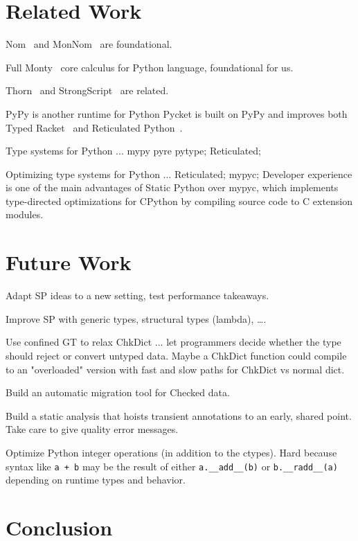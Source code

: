 \documentclass[english,cleveref,submission]{programming}
\newcommand{\SP}{Static Python}
\newcommand{\code}[1]{\texttt{#1}}
\begin{document}
\section{Related Work}
\label{s:related}

Nom~\cite{mt-oopsla-2017} and MonNom~\cite{mt-oopsla-2021} are foundational.

Full Monty~\cite{pmmwplck-oopsla-2013} core calculus for Python language, foundational for us.

Thorn~\cite{wnlov-popl-2010} and StrongScript~\cite{rzv-ecoop-2015} are related.

PyPy is another runtime for Python
Pycket is built on PyPy and improves both Typed Racket~\cite{bbst-oopsla-2017}
and Reticulated Python~\cite{vsc-dls-2019}.

Type systems for Python ...
mypy pyre pytype;
Reticulated;

Optimizing type systems for Python ...
Reticulated;
mypyc;
Developer experience is one of the main advantages of \SP{} over mypyc,
which implements type-directed optimizations for CPython
by compiling source code to C extension modules.



\section{Future Work}
\label{s:future}

Adapt SP ideas to a new setting, test performance takeaways.

Improve SP with generic types, structural types (lambda), \ldots.

Use confined GT to relax ChkDict ... let programmers decide whether
the type should reject or convert untyped data.
Maybe a ChkDict function could compile to an "overloaded" version with
fast and slow paths for ChkDict vs normal dict.

Build an automatic migration tool for Checked data.

Build a static analysis that hoists transient annotations to an early, shared point.
Take care to give quality error messages.

Optimize Python integer operations (in addition to the ctypes).
Hard because syntax like \code{a + b} may be the result of either \code{a.\_\_add\_\_(b)}
or \code{b.\_\_radd\_\_(a)} depending on runtime types and behavior.


\section{Conclusion}
\label{s:conclusion}
\end{document}
